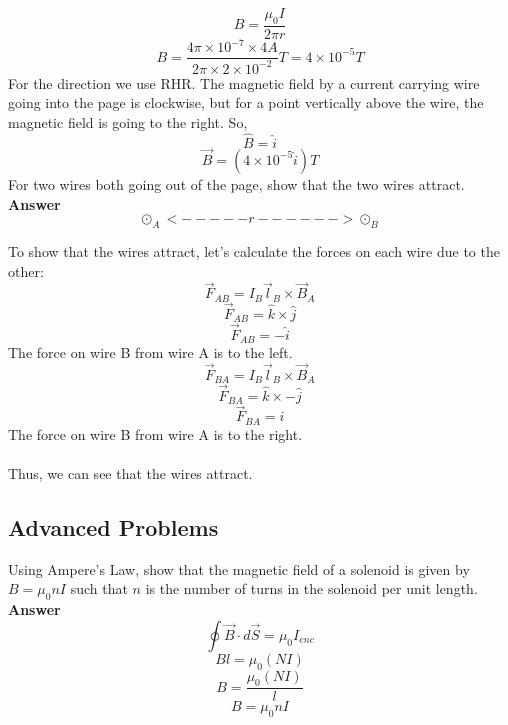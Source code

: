 \documentclass[9pt,addpoints]{exam}
\begin{document}
\begin{questions}
		$$B=\dfrac{\mu_0 I}{2\pi r}$$
		$$B=\dfrac{4\pi\times10^{-7}\times4A}{2\pi\times2\times10^{-2}}T=4\times10^{-5}T$$
		For the direction we use RHR. The magnetic field by a current carrying wire going into the page is clockwise, but for a point vertically above the wire, the magnetic field is going to the right. So,
		$$\hat{B}=\hat{i}$$
		$$\vec{B}=(4\times10^{-5}\hat{i})T$$
		\question For two wires both going out of the page, show that the two wires attract. \\ \textbf{Answer} \\
		
		$$\odot_A<-----r------>\odot_B$$
	
		To show that the wires attract, let's calculate the forces on each wire due to the other:
		$$\vec{F}_{AB}=I_B\vec{l}_B\times \vec{B}_A$$
		$$\vec{F}_{AB}=\hat{k}\times\hat{j}$$
		$$\vec{F}_{AB}=-\hat{i}$$
		The force on wire B from wire A is to the left.
		$$\vec{F}_{BA}=I_B\vec{l}_B\times \vec{B}_A$$
		$$\vec{F}_{BA}=\hat{k}\times-\hat{j}$$
		$$\vec{F}_{BA}=\hat{i}$$
		The force on wire B from wire A is to the right. \\ \\
		Thus, we can see that the wires attract.
		\subsection*{Advanced Problems}
		\question Using Ampere's Law, show that the magnetic field of a solenoid is given by $B=\mu_0nI$ such that $n$ is the number of turns in the solenoid per unit length. 	\\ \textbf{Answer} \\
		$$\oint\vec{B}\cdot d\vec{S}=\mu_0I_{enc}$$
		$$Bl=\mu_0(NI)$$
		$$B=\dfrac{\mu_0(NI)}{l}$$
		$$B=\mu_0nI$$
	\end{questions}		
\end{document}
